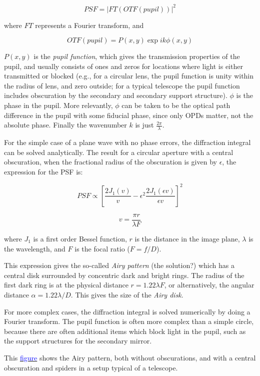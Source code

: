 \documentclass[12pt]{article}
\begin{document}
$$ PSF = \left\vert FT(OTF(pupil))\right\vert^2 $$

where $FT$ represents a Fourier transform, and

$$ OTF(pupil) = P(x,y)\exp{ik\phi(x,y)} $$

$P(x,y)$ is the \emph{pupil function}, which gives the transmission
properties of the pupil, and usually consists of ones and zeros for
locations where light is either transmitted or blocked (e.g., for a
circular lens, the pupil function is unity within the radius of lens,
and zero outside; for a typical telescope the pupil function includes
obscuration by the secondary and secondary support structure).
$\phi$ is the phase in the pupil. More relevantly, $\phi$ can be
taken to be the optical path difference in the pupil with some
fiducial phase, since only OPDs matter, not the absolute phase.
Finally the wavenumber $k$ is just $\frac{2\pi}{\lambda}$.

For the simple case of a plane wave with no phase errors, the
diffraction integral can be solved analytically. The result for a
circular aperture with a central obscuration, when the fractional
radius of the obscuration is given by $\epsilon$, the expression for
the PSF is:

$$ PSF \propto \left[\frac{2J_1(v)}{v}-
    \epsilon^2\frac{2J_1(\epsilon v)}{\epsilon v} \right]^2$$

    $$ v = \frac{\pi r}{\lambda F} $$

where $J_1$ is a first order Bessel function, $r$ is the distance in the
image plane, $\lambda$ is the wavelength, and $F$ is the focal ratio
($F=f/D$).

This expression gives the so-called \emph{Airy pattern} (the solution?)
which has a central disk surrounded by concentric dark and bright rings.
The radius of the first dark ring is at the physical distance
$r = 1.22\lambda F$, or alternatively, the angular distance
$\alpha = 1.22\lambda/D$. This gives the size of the \emph{Airy disk}.

For more complex cases, the diffraction integral is solved
numerically by doing a Fourier transform. The pupil function is often
more complex than a simple circle, because there are often additional
items which block light in the pupil, such as the support structures
for the secondary mirror.

This \href{http://astronomy.nmsu.edu/holtz/a535/html/diagrams/a535/airy.htm}
{\textcolor{blue}{figure}} shows the Airy pattern, both without obscurations,
and with a central obscuration and spiders in a setup typical of a telescope.
\end{document}
